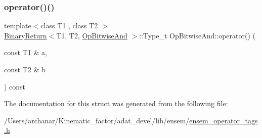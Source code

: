 \mbox{\label{structOpBitwiseAnd_aa3f0de5d7060f7385f0fb035d16f09d3}} 
\subsubsection{\texorpdfstring{operator()()}{operator()()}\hspace{0.1cm}{\footnotesize\ttfamily [2/2]}}
{\footnotesize\ttfamily template$<$class T1 , class T2 $>$ \\
\mbox{\hyperlink{structBinaryReturn}{Binary\+Return}}$<$T1, T2, \mbox{\hyperlink{structOpBitwiseAnd}{Op\+Bitwise\+And}} $>$\+::Type\+\_\+t Op\+Bitwise\+And\+::operator() (\begin{DoxyParamCaption}\item[{const T1 \&}]{a,  }\item[{const T2 \&}]{b }\end{DoxyParamCaption}) const\hspace{0.3cm}{\ttfamily [inline]}}



The documentation for this struct was generated from the following file\+:\begin{DoxyCompactItemize}
\item 
/\+Users/archanar/\+Kinematic\+\_\+factor/adat\+\_\+devel/lib/ensem/\mbox{\hyperlink{lib_2ensem_2ensem__operator__tags_8h}{ensem\+\_\+operator\+\_\+tags.\+h}}\end{DoxyCompactItemize}
